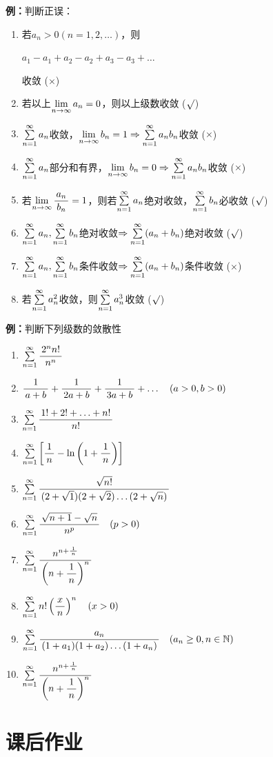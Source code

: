 {\bf 例：}判断正误：
\begin{enumerate}[(1)]
  \setlength{\itemindent}{1cm}
  \item 若$a_n>0(n=1,2,\ldots)$，则\\
  \centerline{$a_1-a_1+a_2-a_2+a_3-a_3+\ldots $}
  收敛 \hfill ({$\times$})
  \item 若以上$\limn a_n=0$，则以上级数收敛 \hfill
  ({$\surd$})
  \item $\sumn a_n$收敛，$\limn b_n=1\Rightarrow\sumn a_nb_n$收敛
  \hfill ({$\times$})
  \item $\sumn a_n$部分和有界，$\limn b_n=0\Rightarrow\sumn a_nb_n$收敛
  \hfill ({$\times$})
  \item 若$\limn\df{a_n}{b_n}=1$，则若$\sumn a_n$绝对收敛，$\sumn b_n$必收敛 \hfill
  ({$\surd$})
  \item $\sumn a_n,\sumn b_n$绝对收敛$\Rightarrow\sumn (a_n+b_n)$绝对收敛 \hfill
  ({$\surd$})
  \item $\sumn a_n,\sumn b_n$条件收敛$\Rightarrow\sumn (a_n+b_n)$条件收敛 \hfill
  ({$\times$})
  \item 若$\sumn a_n^2$收敛，则$\sumn a_n^3$收敛 \hfill
  ({$\surd$})
\end{enumerate}

{\bf 例：}判断下列级数的敛散性
\begin{enumerate}[(1)]
  \setlength{\itemindent}{1cm}
  \item $\sumn\df{2^nn!}{n^n}$
  \item $\df 1{a+b}+\df 1{2a+b}+\df 1{3a+b}+\ldots\quad (a>0,b>0)$
  \item $\sumn\df{1!+2!+\ldots+n!}{n!}$
  \item $\sumn\left[\df 1n-\ln\left(1+\df 1n\right)\right]$
  \item $\sumn\df{\sqrt{n!}}{(2+\sqrt 1)(2+\sqrt 2)\ldots(2+\sqrt n)}$
  \item $\sumn\df{\sqrt{n+1}-\sqrt{n}}{n^p}\quad(p>0)$
  \item $\sumn\df{n^{n+\frac 1{\,n\,}}}{\left(n+\df 1n\right)^n}$
  \item $\sumn n!\left(\df{x}{n}\right)^n\quad (x>0)$
  \item $\sumn\df {a_n}{(1+a_1)(1+a_2)\ldots(1+a_n)}\quad(a_n\geq
	  0,n\in\mathbb{N})$
  \item $\sumn\df{n^{n+\frac 1{\,n\,}}}{\left(n+\df 1n\right)^n}$
\end{enumerate}

\newpage

\section*{课后作业}

